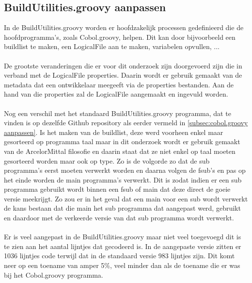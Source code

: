 \subsection{BuildUtilities.groovy aanpassen}
In de BuildUtilities.groovy worden er hoofdzakelijk processen gedefinieerd die de hoofdprogramma's, zoals Cobol.groovy, helpen. Dit kan door bijvoorbeeld een buildlist te maken, een LogicalFile aan te maken, variabelen opvullen, ...
\\ \\
De grootste veranderingen die er voor dit onderzoek zijn doorgevoerd zijn die in verband met de LogicalFile properties. Daarin wordt er gebruik gemaakt van de metadata dat een ontwikkelaar meegeeft via de properties bestanden. Aan de hand van die properties zal de LogicalFile aangemaakt en ingevuld worden.
\\ \\
Nog een verschil met het standaard BuildUtilities.groovy programma, dat te vinden is op dezelfde Github repository als eerder vermeld in \ref{subsec:cobol.groovy aanpassen}. Is het maken van de buildlist, deze werd voorheen enkel maar gesorteerd op programma taal maar in dit onderzoek wordt er gebruik gemaakt van de ArcelorMittal filosofie en daarin staat dat ze niet enkel op taal moeten gesorteerd worden maar ook op type. Zo is de volgorde zo dat de sub programma's eerst moeten verwerkt worden en daarna volgen de fsub's en pas op het einde worden de main programma's verwerkt. Dit is zodat indien er een sub programma gebruikt wordt binnen een fsub of main dat deze direct de goeie versie meekrijgt. Zo zou er in het geval dat een main voor een sub wordt verwerkt de kans bestaan dat die main het sub programma dat aangepast werd, gebruikt en daardoor met de verkeerde versie van dat sub programma wordt verwerkt. 
\\ \\
Er is veel aangepast in de BuildUtilities.groovy maar niet veel toegevoegd dit is te zien aan het aantal lijntjes dat gecodeerd is. In de aangepaste versie zitten er 1036 lijntjes code terwijl dat in de standaard versie 983 lijntjes zijn. Dit komt neer op een toename van amper 5\%, veel minder dan als de toename die er was bij het Cobol.groovy programma. 


